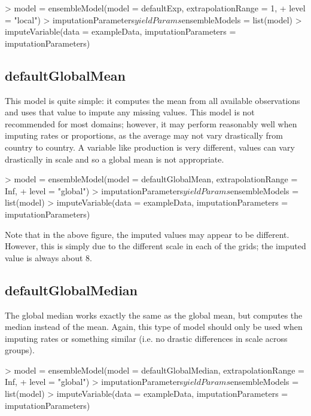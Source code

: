 \documentclass[nojss]{jss}
\begin{document}
\begin{Schunk}
\begin{Sinput}
> model = ensembleModel(model = defaultExp, extrapolationRange = 1,
+                       level = "local")
> imputationParameters$yieldParams$ensembleModels = list(model)
> imputeVariable(data = exampleData, imputationParameters = imputationParameters)
\end{Sinput}
\end{Schunk}

\subsection{defaultGlobalMean}

This model is quite simple: it computes the mean from all available
observations and uses that value to impute any missing values.  This model is
not recommended for most domains; however, it may perform reasonably well when
imputing rates or proportions, as the average may not vary drastically from
country to country.  A variable like production is very different, values can
vary drastically in scale and so a global mean is not appropriate.

\begin{Schunk}
\begin{Sinput}
> model = ensembleModel(model = defaultGlobalMean, extrapolationRange = Inf,
+                       level = "global")
> imputationParameters$yieldParams$ensembleModels = list(model)
> imputeVariable(data = exampleData, imputationParameters = imputationParameters)
\end{Sinput}
\end{Schunk}

Note that in the above figure, the imputed values may appear to be different.
However, this is simply due to the different scale in each of the grids; the
imputed value is always about 8.

\subsection{defaultGlobalMedian}

The global median works exactly the same as the global mean, but computes the
median instead of the mean.  Again, this type of model should only be used when
imputing rates or something similar (i.e. no drastic differences in scale
across groups).

\begin{Schunk}
\begin{Sinput}
> model = ensembleModel(model = defaultGlobalMedian, extrapolationRange = Inf,
+                       level = "global")
> imputationParameters$yieldParams$ensembleModels = list(model)
> imputeVariable(data = exampleData, imputationParameters = imputationParameters)
\end{Sinput}
\end{Schunk}
\end{document}
